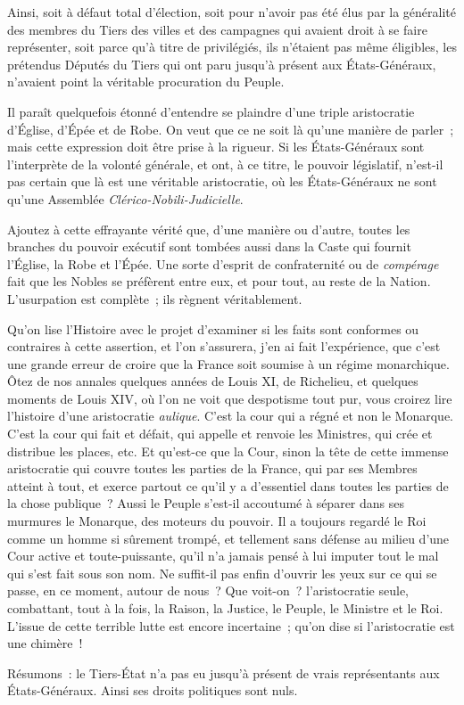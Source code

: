 \documentclass[french,twoside]{book} %
\begin{document}
Ainsi, soit à défaut total d’élection, soit pour n’avoir pas été élus par la généralité des membres du Tiers des villes et des campagnes qui avaient droit à se faire représenter, soit parce qu’à titre de privilégiés, ils n’étaient pas même éligibles, les prétendus Députés du Tiers qui ont paru jusqu’à présent aux États-Généraux, n’avaient point la véritable procuration du Peuple.\par
Il paraît quelquefois étonné d’entendre se plaindre d’une triple aristocratie d’Église, d’Épée et de Robe. On veut que ce ne soit là qu’une manière de parler ; mais cette expression doit être prise à la rigueur. Si les États-Généraux sont l’interprète de la volonté générale, et ont, à ce titre, le pouvoir législatif, n’est-il pas certain que là est une véritable aristocratie, où les États-Généraux ne sont qu’une Assemblée {\itshape Clérico-Nobili-Judicielle}.\par
Ajoutez à cette effrayante vérité que, d’une manière ou d’autre, toutes les branches du pouvoir exécutif sont tombées aussi dans la Caste qui fournit l’Église, la Robe et l’Épée. Une sorte d’esprit de confraternité ou de {\itshape compérage} fait que les Nobles se préfèrent entre eux, et pour tout, au reste de la Nation. L’usurpation est complète ; ils règnent véritablement.\par
Qu’on lise l’Histoire avec le projet d’examiner si les faits sont conformes ou contraires à cette assertion, et l’on s’assurera, j’en ai fait l’expérience, que c’est une grande erreur de croire que la France soit soumise à un régime monarchique. Ôtez de nos annales quelques années de Louis XI, de Richelieu, et quelques moments de Louis XIV, où l’on ne voit que despotisme tout pur, vous croirez lire l’histoire d’une aristocratie {\itshape aulique}. C’est la cour qui a régné et non le Monarque. C’est la cour qui fait et défait, qui appelle et renvoie les Ministres, qui crée et distribue les places, etc. Et qu’est-ce que la Cour, sinon la tête de cette immense aristocratie qui couvre toutes les parties de la France, qui par ses Membres atteint à tout, et exerce partout ce qu’il y a d’essentiel dans toutes les parties de la chose publique ? Aussi le Peuple s’est-il accoutumé à séparer dans ses murmures le Monarque, des moteurs du pouvoir. Il a toujours regardé le Roi comme un homme si sûrement trompé, et tellement sans défense au milieu d’une Cour active et toute-puissante, qu’il n’a jamais pensé à lui imputer tout le mal qui s’est fait sous son nom. Ne suffit-il pas enfin d’ouvrir les yeux sur ce qui se passe, en ce moment, autour de nous ? Que voit-on ? l’aristocratie seule, combattant, tout à la fois, la Raison, la Justice, le Peuple, le Ministre et le Roi. L’issue de cette terrible lutte est encore incertaine ; qu’on dise si l’aristocratie est une chimère !\par
Résumons : le Tiers-État n’a pas eu jusqu’à présent de vrais représentants aux États-Généraux. Ainsi ses droits politiques sont nuls.\par
\end{document}
